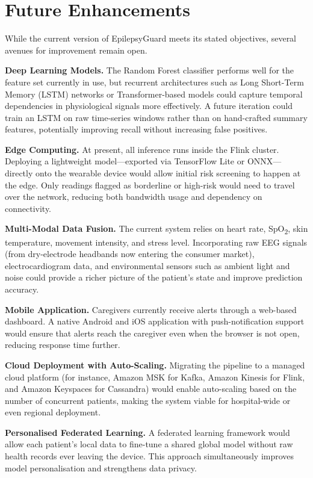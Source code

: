 \documentclass[12pt, a4paper, oneside]{report}
\begin{document}
\chapter{Future Enhancements}

While the current version of EpilepsyGuard meets its stated objectives, several avenues for improvement remain open.

\textbf{Deep Learning Models.}
The Random Forest classifier performs well for the feature set currently in use, but recurrent architectures such as Long Short-Term Memory (LSTM) networks or Transformer-based models could capture temporal dependencies in physiological signals more effectively. A future iteration could train an LSTM on raw time-series windows rather than on hand-crafted summary features, potentially improving recall without increasing false positives.

\textbf{Edge Computing.}
At present, all inference runs inside the Flink cluster. Deploying a lightweight model---exported via TensorFlow Lite or ONNX---directly onto the wearable device would allow initial risk screening to happen at the edge. Only readings flagged as borderline or high-risk would need to travel over the network, reducing both bandwidth usage and dependency on connectivity.

\textbf{Multi-Modal Data Fusion.}
The current system relies on heart rate, SpO\textsubscript{2}, skin temperature, movement intensity, and stress level. Incorporating raw EEG signals (from dry-electrode headbands now entering the consumer market), electrocardiogram data, and environmental sensors such as ambient light and noise could provide a richer picture of the patient's state and improve prediction accuracy.

\textbf{Mobile Application.}
Caregivers currently receive alerts through a web-based dashboard. A native Android and iOS application with push-notification support would ensure that alerts reach the caregiver even when the browser is not open, reducing response time further.

\textbf{Cloud Deployment with Auto-Scaling.}
Migrating the pipeline to a managed cloud platform (for instance, Amazon MSK for Kafka, Amazon Kinesis for Flink, and Amazon Keyspaces for Cassandra) would enable auto-scaling based on the number of concurrent patients, making the system viable for hospital-wide or even regional deployment.

\textbf{Personalised Federated Learning.}
A federated learning framework would allow each patient's local data to fine-tune a shared global model without raw health records ever leaving the device. This approach simultaneously improves model personalisation and strengthens data privacy.
\end{document}
